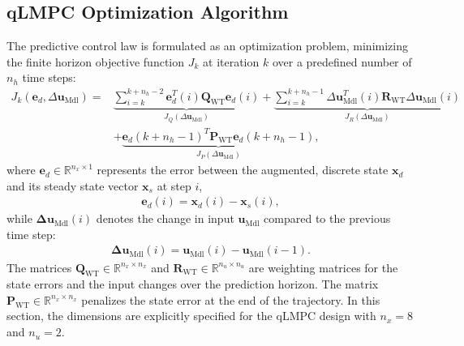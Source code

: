 \subsection{qLMPC Optimization Algorithm}\label{sec:qLMPCOptimizationAlgo}
The predictive control law is formulated as an optimization problem, minimizing the finite horizon objective function \( J_k \) at iteration \( k \) over a predefined number of \( n_h \) time steps:
\begin{align*}
    J_k(\bm{e}_d, \Delta \bm{u}_{\text{Mdl}}) = & \underbrace{ \sum_{i=k}^{k+n_h-2}  \bm{e}_{d}^T(i) \bm{Q}_{\text{WT}} \bm{e}_{d}(i)}_{J_Q(\Delta \bm{u}_{\text{Mdl}})} + \underbrace{\sum_{i=k}^{k+n_h-1} \Delta \bm{u}^T_{\text{Mdl}}(i) \bm{R}_{\text{WT}} \Delta \bm{u}_{\text{Mdl}}(i)}_{J_R(\Delta \bm{u}_{\text{Mdl}})} \\
    &+ \underbrace{\bm{e}_{d}(k+n_h-1)^T \bm{P}_{\text{WT}} \bm{e}_{d}(k+n_h-1)}_{J_P(\Delta \bm{u}_{\text{Mdl}})},
\end{align*}
where \( \bm{e}_{d} \in \mathbb{R}^{n_x \times 1} \) represents the error between the augmented, discrete state \( \bm{x}_{d}\) and its steady state vector $\bm{x}_{s}$ at step \( i \),
\begin{align*}
    \bm{e}_{d}(i) = \bm{x}_{d}(i) - \bm{x}_{s}(i),
\end{align*}
while $\bm{\Delta u}_{\text{Mdl}}(i)$ denotes the change in input  $\bm{u}_{\text{Mdl}}$ compared to the previous time step:
\begin{align*}
    \bm{\Delta u}_{\text{Mdl}}(i) = \bm{u}_{\text{Mdl}}(i) - \bm{u}_{\text{Mdl}}(i-1).
\end{align*}
The matrices \( \bm{Q}_{\text{WT}} \in \mathbb{R}^{n_x \times n_x} \) and \( \bm{R}_{\text{WT}} \in \mathbb{R}^{n_u \times n_u} \) are weighting matrices for the state errors and the input changes over the prediction horizon. The matrix \( \bm{P}_{\text{WT}} \in \mathbb{R}^{n_x \times n_x} \) penalizes the state error at the end of the trajectory. In this section, the dimensions are explicitly specified for the qLMPC design with \( n_x = 8 \) and \( n_u = 2 \).

